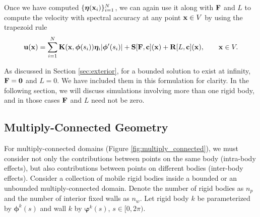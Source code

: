 Once we have computed $\{\bm{\eta}({\mathbf{x}}_i)\}_{i=1}^N$, we can again use it along with ${\mathbf{F}}$ and $L$ to compute the velocity with spectral accuracy at any point ${\mathbf{x}} \in V$ by using the trapezoid rule
\[ {\mathbf{u}}({\mathbf{x}}) = \sum\limits_{i=1}^N \mathbf{K}({\mathbf{x}}, \bm{\phi}(s_i))\bm{\eta}_i | \bm{\phi}'(s_i)| + \mathbf{S}[{\mathbf{F}},{\mathbf{c}}]({\mathbf{x}}) + \mathbf{R}[L,{\mathbf{c}}]({\mathbf{x}}), \qquad {\mathbf{x}} \in V.\]

As discussed in Section \ref{sec:exterior}, for a bounded solution to exist at infinity, ${\mathbf{F}}=\mathbf{0}$ and $L=0$. We have included them in this formulation for clarity. In the following section, we will discuss simulations involving more than one rigid body, and in those cases ${\mathbf{F}}$ and $L$ need not be zero.

\subsection{Multiply-Connected Geometry}

For multiply-connected domains (Figure \ref{fig:multiply_connected}), we must  consider not only the contributions between points on the same body (intra-body effects), but also contributions between points on different bodies (inter-body effects). Consider a collection of mobile rigid bodies inside a bounded or an unbounded multiply-connected domain. Denote the number of rigid bodies as $n_p$ and the number of interior fixed walls as $n_w$. Let rigid body $k$ be parameterized by $\bm{\phi}^k(s)$ and wall $k$ by $\bm{\varphi}^k(s)$, $s\in [0,2\pi)$. 

